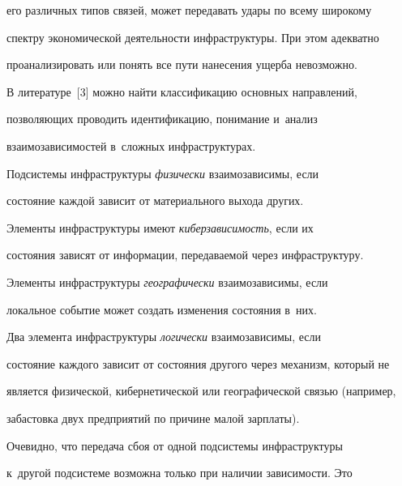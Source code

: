 его различных типов связей, может передавать удары по всему широкому  


спект\-ру экономической деятельности инфраструктуры. При этом адекватно 


проанализировать или понять все пути нанесения ущер\-ба не\-воз\-можно.


  


  В литературе~[3] можно найти классификацию основных на\-прав\-ле\-ний,  


поз\-во\-ля\-ющих проводить идентификацию, понимание и~анализ 


взаимозависимостей в~слож\-ных инфраструктурах. 


  


  Подсистемы инфраструктуры \textit{физически} взаимозависимы, если  


со\-сто\-яние каж\-дой зависит от материального выхода других.


  


  Элементы инфраструктуры имеют \textit{ки\-бер\-за\-ви\-си\-мость}, если их  


со\-сто\-яния зависят от информации, пе\-ре\-да\-ва\-емой через инфраструктуру.


  


  Элементы инфраструктуры \textit{географически} взаимозависимы, если 


локальное событие может создать изменения со\-сто\-яния в~них.





\pagebreak


  


  Два элемента инфраструктуры \textit{логически} взаимозависимы, если 


состояние каждого зависит от со\-сто\-яния другого через механизм, который не 


является физической, кибернетической или гео\-гра\-фи\-че\-ской связью (например, 


забастовка двух предприятий по причине малой зар\-пла\-ты).


  


  Очевидно, что передача сбоя от одной под\-сис\-те\-мы инфраструктуры 


к~другой под\-сис\-те\-ме воз\-мож\-на только при наличии за\-ви\-си\-мости. Это 



